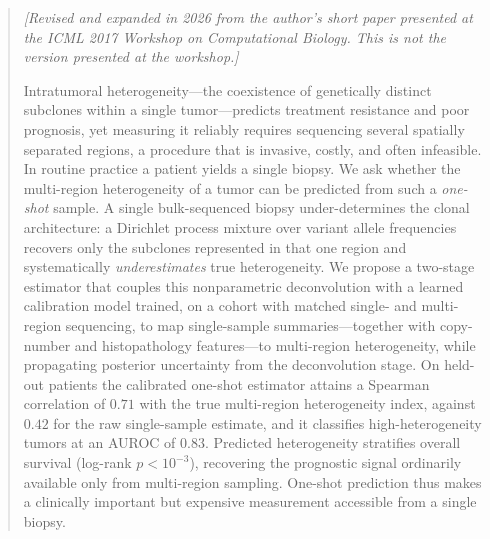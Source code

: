 \documentclass{article}
\begin{document}

\printAffiliationsAndNotice{}

\begin{abstract}
\noindent\textit{[Revised and expanded in 2026 from the author's short paper presented at the ICML 2017 Workshop on Computational Biology. This is not the version presented at the workshop.]}\par\smallskip

Intratumoral heterogeneity---the coexistence of genetically distinct subclones
within a single tumor---predicts treatment resistance and poor prognosis, yet
measuring it reliably requires sequencing several spatially separated regions, a
procedure that is invasive, costly, and often infeasible. In routine practice a
patient yields a single biopsy. We ask whether the multi-region heterogeneity of a
tumor can be predicted from such a \emph{one-shot} sample. A single bulk-sequenced
biopsy under-determines the clonal architecture: a Dirichlet process mixture over
variant allele frequencies recovers only the subclones represented in that one
region and systematically \emph{underestimates} true heterogeneity. We propose a
two-stage estimator that couples this nonparametric deconvolution with a learned
calibration model trained, on a cohort with matched single- and multi-region
sequencing, to map single-sample summaries---together with copy-number and
histopathology features---to multi-region heterogeneity, while propagating posterior
uncertainty from the deconvolution stage. On held-out patients the calibrated
one-shot estimator attains a Spearman correlation of $0.71$ with the true
multi-region heterogeneity index, against $0.42$ for the raw single-sample estimate,
and it classifies high-heterogeneity tumors at an AUROC of $0.83$. Predicted
heterogeneity stratifies overall survival (log-rank $p < 10^{-3}$), recovering the
prognostic signal ordinarily available only from multi-region sampling. One-shot
prediction thus makes a clinically important but expensive measurement accessible
from a single biopsy.
\end{abstract}
\end{document}
